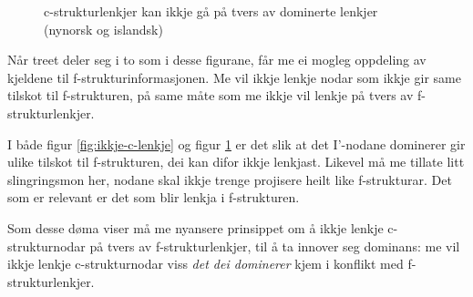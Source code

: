 \documentclass[12pt,a4paper,oneside,draft]{report}
\newcommand{\proj}[2]{\begin{tabular}{c}\footnotesize{#1}\\\normalsize{#2}\end{tabular}}
\newcommand{\ua}{\ensuremath{\uparrow}}
\newcommand{\da}{\ensuremath{\downarrow}}
\begin{document}
  \begin{figure}[htp]
  \centering
     \caption{c\hyp{}strukturlenkjer kan ikkje gå på tvers av dominerte
     lenkjer (nynorsk og islandsk)}
     \label{fig:ikkje-c-lenkje-pro-drop}
    \end{figure}


Når treet deler seg i to som i desse figurane, får me ei mogleg
oppdeling av kjeldene til f\hyp{}strukturinformasjonen. Me vil ikkje lenkje
nodar som ikkje gir same tilskot til f\hyp{}strukturen, på same måte som me
ikkje vil lenkje på tvers av f\hyp{}strukturlenkjer.

I både figur \ref{fig:ikkje-c-lenkje} og figur
\ref{fig:ikkje-c-lenkje-pro-drop} er det slik at det I'-nodane dominerer gir
ulike tilskot til f\hyp{}strukturen, dei kan difor ikkje lenkjast. Likevel
må me tillate litt slingringsmon her, nodane skal ikkje trenge
projisere heilt like f\hyp{}strukturar. Det som er relevant er det som blir
lenkja i f\hyp{}strukturen.

Som desse døma viser må me nyansere prinsippet om å ikkje lenkje
c\hyp{}strukturnodar på tvers av f\hyp{}strukturlenkjer, til å ta innover
seg dominans: me vil ikkje lenkje c\hyp{}strukturnodar viss \emph{det dei dominerer} kjem i konflikt med f\hyp{}strukturlenkjer.
\end{document}
